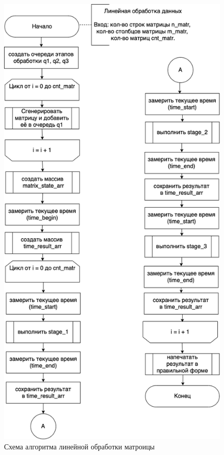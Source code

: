 \begin{figure}[h]
	\centering
	\includegraphics[scale=0.55]{img/linear_processing.png}
	\caption{Схема алгоритма линейной обработки матроицы}
	\label{fig:linear_processing}
\end{figure}

